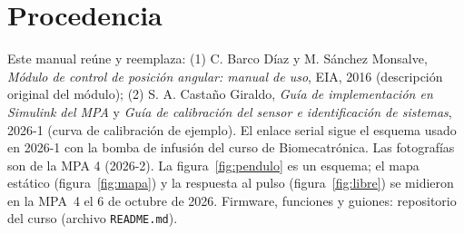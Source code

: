 \documentclass[11pt,letterpaper]{article}
\begin{document}
\section*{Procedencia}
{\small Este manual reúne y reemplaza: (1) C. Barco Díaz y M. Sánchez Monsalve, \emph{Módulo de control de posición angular: manual de uso}, EIA, 2016 (descripción original del módulo); (2) S. A. Castaño Giraldo, \emph{Guía de implementación en Simulink del MPA} y \emph{Guía de calibración del sensor e identificación de sistemas}, 2026-1 (curva de calibración de ejemplo). El enlace serial sigue el esquema usado en 2026-1 con la bomba de infusión del curso de Biomecatrónica. Las fotografías son de la MPA 4 (2026-2). La figura~\ref{fig:pendulo} es un esquema; el mapa estático (figura~\ref{fig:mapa}) y la respuesta al pulso (figura~\ref{fig:libre}) se midieron en la MPA~4 el 6 de octubre de 2026. Firmware, funciones y guiones: repositorio del curso (archivo \texttt{README.md}).}
\end{document}

